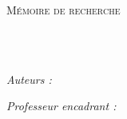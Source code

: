 \documentclass[
11pt, %
francais, %
singlespacing, %
headsepline, %
]{MastersDoctoralThesis} %
\author{Brice \textsc{Gonel} \\ Romain \textsc{Pinguet}} %
\begin{document}
\pagestyle{plain} %


\begin{titlepage}
\begin{center}

\vspace*{.06\textheight}

\textsc{\Large Mémoire de recherche}\\[0.5cm] %

\HRule \\[0.4cm] %
{\huge \bfseries \ttitle\par}\vspace{0.4cm} %
\HRule \\[1.5cm] %
 
\begin{minipage}[t]{0.4\textwidth}
\begin{flushleft} \large
\emph{Auteurs :}\\
\authorname %
\end{flushleft}
\end{minipage}
\begin{minipage}[t]{0.4\textwidth}
\begin{flushright} \large
\emph{Professeur encadrant :} \\
\supname %
\end{flushright}
\end{minipage}\\[3cm]
 
\end{center}
\end{titlepage}


\tableofcontents %

\end{document}
